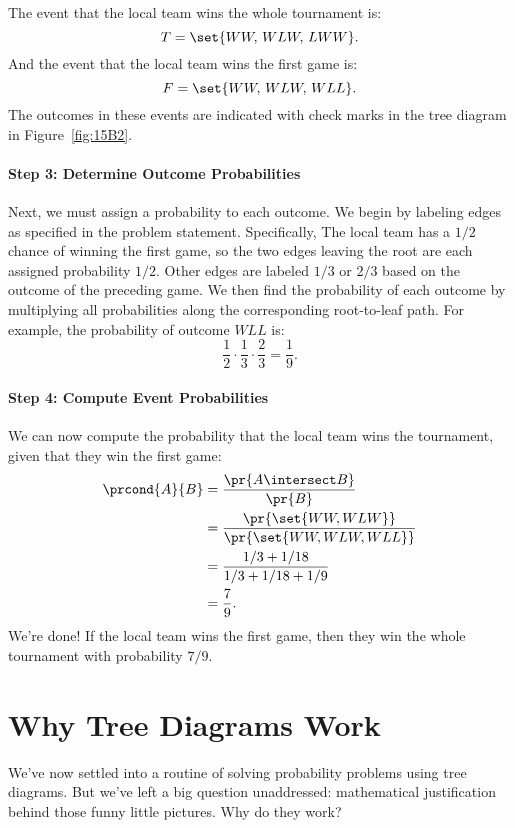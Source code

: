 The event that the local team wins the whole tournament is:
%
\[
    T = \set{WW,\, WLW,\, LWW}.
\]
%
And the event that the local team wins the first game is:
%
\[
    F = \set{WW,\, WLW,\, WLL }.
\]
%
The outcomes in these events are indicated with check marks in the tree
diagram in Figure~\ref{fig:15B2}.

\paragraph{Step 3:  Determine Outcome Probabilities}

Next, we must assign a probability to each outcome.  We begin by
labeling edges as specified in the problem statement.  Specifically,
The local team has a $1/2$ chance of winning the first game, so
the two edges leaving the root are each assigned probability $1/2$.
Other edges are labeled $1/3$ or $2/3$ based on the outcome of the
preceding game.  We then find the probability of each outcome by
multiplying all probabilities along the corresponding root-to-leaf
path.  For example, the probability of outcome $WLL$ is:
%
\[
    \frac{1}{2} \cdot \frac{1}{3} \cdot \frac{2}{3} = \frac{1}{9}.
\]

\paragraph{Step 4: Compute Event Probabilities}

We can now compute the probability that the local team wins the
tournament, given that they win the first game:
%
\begingroup
{}
\begin{align*}
\prcond{A}{B}
    & = \frac{\pr{A \intersect B}}{\pr{B}} \\
    & = \frac{\pr{\set{WW, WLW}}}{\pr{\set{WW, WLW, WLL}}} \\
    & = \frac{1/3 + 1/18}{1/3 + 1/18 + 1/9} \\
    & = \frac{7}{9}.
\end{align*}
\endgroup
%
We're done!  If the local team wins the first game, then they win
the whole tournament with probability $7 / 9$.

\section{Why Tree Diagrams Work}\label{product_rule_subsec}

We've now settled into a routine of solving probability problems using
tree diagrams.  But we've left a big question unaddressed:
mathematical justification behind those funny little pictures.  Why do
they work?


